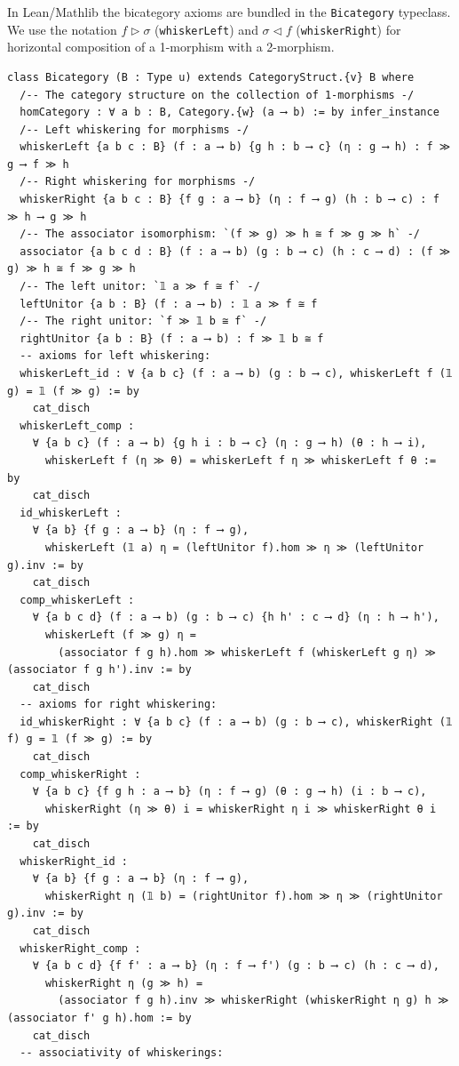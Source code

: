 \documentclass[12pt]{article}
\begin{document}
In Lean/Mathlib the bicategory axioms are bundled in the \lstinline{Bicategory} typeclass.
We use the notation $f \triangleright \sigma$ (\lstinline{whiskerLeft}) and
$\sigma \triangleleft f$ (\lstinline{whiskerRight}) for horizontal composition of a
1-morphism with a 2-morphism.

\begin{lstlisting}
class Bicategory (B : Type u) extends CategoryStruct.{v} B where
  /-- The category structure on the collection of 1-morphisms -/
  homCategory : ∀ a b : B, Category.{w} (a ⟶ b) := by infer_instance
  /-- Left whiskering for morphisms -/
  whiskerLeft {a b c : B} (f : a ⟶ b) {g h : b ⟶ c} (η : g ⟶ h) : f ≫ g ⟶ f ≫ h
  /-- Right whiskering for morphisms -/
  whiskerRight {a b c : B} {f g : a ⟶ b} (η : f ⟶ g) (h : b ⟶ c) : f ≫ h ⟶ g ≫ h
  /-- The associator isomorphism: `(f ≫ g) ≫ h ≅ f ≫ g ≫ h` -/
  associator {a b c d : B} (f : a ⟶ b) (g : b ⟶ c) (h : c ⟶ d) : (f ≫ g) ≫ h ≅ f ≫ g ≫ h
  /-- The left unitor: `𝟙 a ≫ f ≅ f` -/
  leftUnitor {a b : B} (f : a ⟶ b) : 𝟙 a ≫ f ≅ f
  /-- The right unitor: `f ≫ 𝟙 b ≅ f` -/
  rightUnitor {a b : B} (f : a ⟶ b) : f ≫ 𝟙 b ≅ f
  -- axioms for left whiskering:
  whiskerLeft_id : ∀ {a b c} (f : a ⟶ b) (g : b ⟶ c), whiskerLeft f (𝟙 g) = 𝟙 (f ≫ g) := by
    cat_disch
  whiskerLeft_comp :
    ∀ {a b c} (f : a ⟶ b) {g h i : b ⟶ c} (η : g ⟶ h) (θ : h ⟶ i),
      whiskerLeft f (η ≫ θ) = whiskerLeft f η ≫ whiskerLeft f θ := by
    cat_disch
  id_whiskerLeft :
    ∀ {a b} {f g : a ⟶ b} (η : f ⟶ g),
      whiskerLeft (𝟙 a) η = (leftUnitor f).hom ≫ η ≫ (leftUnitor g).inv := by
    cat_disch
  comp_whiskerLeft :
    ∀ {a b c d} (f : a ⟶ b) (g : b ⟶ c) {h h' : c ⟶ d} (η : h ⟶ h'),
      whiskerLeft (f ≫ g) η =
        (associator f g h).hom ≫ whiskerLeft f (whiskerLeft g η) ≫ (associator f g h').inv := by
    cat_disch
  -- axioms for right whiskering:
  id_whiskerRight : ∀ {a b c} (f : a ⟶ b) (g : b ⟶ c), whiskerRight (𝟙 f) g = 𝟙 (f ≫ g) := by
    cat_disch
  comp_whiskerRight :
    ∀ {a b c} {f g h : a ⟶ b} (η : f ⟶ g) (θ : g ⟶ h) (i : b ⟶ c),
      whiskerRight (η ≫ θ) i = whiskerRight η i ≫ whiskerRight θ i := by
    cat_disch
  whiskerRight_id :
    ∀ {a b} {f g : a ⟶ b} (η : f ⟶ g),
      whiskerRight η (𝟙 b) = (rightUnitor f).hom ≫ η ≫ (rightUnitor g).inv := by
    cat_disch
  whiskerRight_comp :
    ∀ {a b c d} {f f' : a ⟶ b} (η : f ⟶ f') (g : b ⟶ c) (h : c ⟶ d),
      whiskerRight η (g ≫ h) =
        (associator f g h).inv ≫ whiskerRight (whiskerRight η g) h ≫ (associator f' g h).hom := by
    cat_disch
  -- associativity of whiskerings:

\end{lstlisting}
\end{document}
